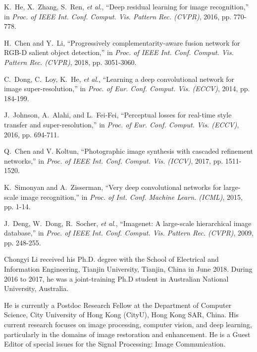 \documentclass[journal]{IEEEtran}
\newcommand{\etal}{\textit{et al}.}
\begin{document}
\begin{thebibliography}{20}
K.~He,  X.~Zhang, S.~Ren, \etal, ``Deep residual learning for image recognition,'' in \emph{Proc. of IEEE Int. Conf. Comput. Vis. Pattern Rec. (CVPR)}, 2016, pp. 770-778.


H.~Chen and Y.~Li, ``Progressively complementarity-aware fusion network for RGB-D salient object detection,'' in \emph{Proc. of IEEE Int. Conf. Comput. Vis. Pattern Rec. (CVPR)}, 2018, pp. 3051-3060.

C.~Dong, C.~Loy, K.~He, \etal,  ``Learning a deep convolutional network for image super-resolution,'' in \emph{Proc. of Eur. Conf. Comput. Vis. (ECCV)}, 2014, pp. 184-199.



J.~Johnson, A.~Alahi, and L.~Fei-Fei, ``Perceptual losses for real-time style transfer and super-resolution,'' in \emph{Proc. of Eur. Conf. Comput. Vis. (ECCV)}, 2016, pp. 694-711.

Q.~Chen and V. Koltun, ``Photographic image synthesis with cascaded refinement networks,'' in \emph{Proc. of IEEE Int. Conf. Comput. Vis. (ICCV)}, 2017, pp. 1511-1520.



K.~Simonyan and A.~Zisserman, ``Very deep convolutional networks for large-scale image recognition,'' in \emph{Proc. of Int. Conf. Machine Learn. (ICML)}, 2015, pp. 1-14.

J.~Deng,  W.~Dong, R.~Socher, \etal, ``Imagenet: A large-scale hierarchical image database,'' in \emph{Proc. of IEEE Int. Conf. Comput. Vis. Pattern Rec. (CVPR)}, 2009, pp. 248-255.



\end{thebibliography}



\begin{IEEEbiography}{Chongyi Li}
received his Ph.D. degree with the School of Electrical and Information Engineering, Tianjin University, Tianjin, China in June 2018. During 2016 to 2017, he was a joint-training Ph.D student in Australian National University, Australia.\par
He is currently a Postdoc Research Fellow at the Department of Computer Science, City University of Hong Kong (CityU), Hong Kong SAR, China. His current research focuses on image processing, computer vision, and deep learning, particularly in the domains of image restoration and enhancement. He is a Guest Editor of special issues for the Signal Processing: Image Communication.
\end{IEEEbiography}
\end{document}
